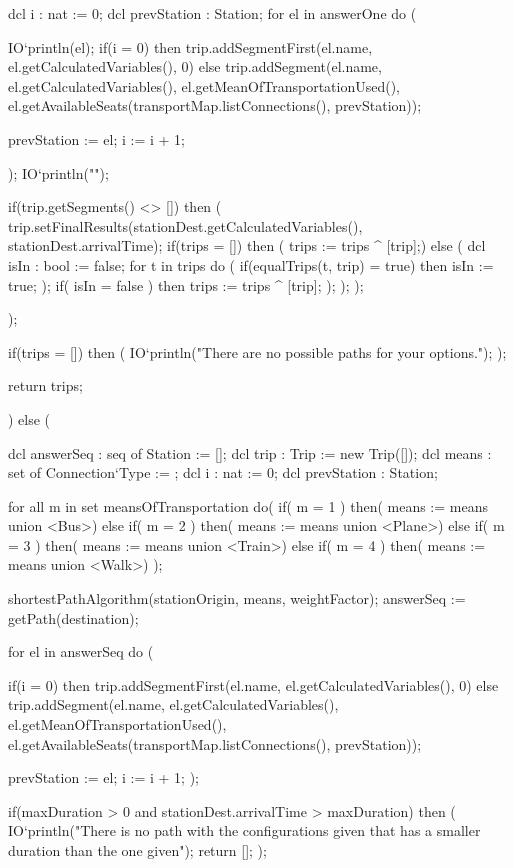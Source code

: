 \begin{vdmpp}[breaklines=true]
     dcl i : nat := 0;
     dcl prevStation : Station;
     for el in answerOne do (
      
      IO`println(el);
      if(i = 0) then trip.addSegmentFirst(el.name, el.getCalculatedVariables(), 0)
      else trip.addSegment(el.name, el.getCalculatedVariables(), el.getMeanOfTransportationUsed(), el.getAvailableSeats(transportMap.listConnections(), prevStation));
      
      prevStation := el;
      i := i + 1;

     );
     IO`println("\n\n");
     
     if(trip.getSegments() <> []) then (
      trip.setFinalResults(stationDest.getCalculatedVariables(), stationDest.arrivalTime);
      if(trips = []) then (
        trips := trips ^ [trip];)
      else (
        dcl isIn : bool := false;
        for t in trips do (
          if(equalTrips(t, trip) = true) then
            isIn := true;
        );
        if( isIn = false ) then
          trips := trips ^ [trip];
      );
     );
    );
    
   );
   
   if(trips = []) then (
     IO`println("There are no possible paths for your options."); 
   );
   
   return trips;
   
   
  ) 
  else (
   
   dcl answerSeq : seq of Station := [];
   dcl trip : Trip := new Trip([]);
   dcl means : set of Connection`Type := {};
   dcl i : nat := 0;
   dcl prevStation : Station;
   
   for all m in set meansOfTransportation do(
    if( m = 1 ) then(
    means := means union {<Bus>})
    else if( m = 2 ) then(
    means := means union {<Plane>})
    else if( m = 3 ) then(
    means := means union {<Train>})
    else if( m = 4 ) then(
    means := means union {<Walk>})
   );
      
   shortestPathAlgorithm(stationOrigin, means, weightFactor);
   answerSeq := getPath(destination);
   
   for el in answerSeq do (
   
      if(i = 0) then trip.addSegmentFirst(el.name, el.getCalculatedVariables(), 0)
     else trip.addSegment(el.name, el.getCalculatedVariables(), el.getMeanOfTransportationUsed(), el.getAvailableSeats(transportMap.listConnections(), prevStation));
     
     prevStation := el;
     i := i + 1;
   );
   
   if(maxDuration > 0 and stationDest.arrivalTime > maxDuration) then (
    IO`println("There is no path with the configurations given that has a smaller duration than the one given");
    return []; 
   );
    

\end{vdmpp}
